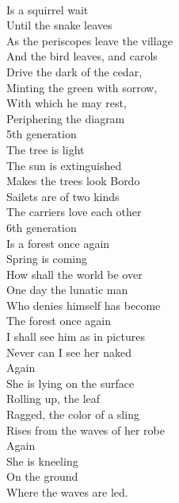 \documentclass[smalldemyvopaper,11pt,twoside,onecolumn,openright,extrafontsizes]{memoir}
\begin{document}
\\Is a squirrel wait
\\Until the snake leaves
\\As the periscopes leave the village
\\And the bird leaves, and carols
\\Drive the dark of the cedar,
\\Minting the green with sorrow,
\\With which he may rest,
\\Periphering the diagram
\\5th generation
\\The tree is light
\\The sun is extinguished
\\Makes the trees look Bordo
\\Sailets are of two kinds
\\The carriers love each other
\\6th generation
\\Is a forest once again
\\Spring is coming
\\How shall the world be over
\\One day the lunatic man
\\Who denies himself has become
\\The forest once again
\\I shall see him as in pictures
\\Never can I see her naked
\\Again
\\She is lying on the surface
\\Rolling up, the leaf
\\Ragged, the color of a sling
\\Rises from the waves of her robe
\\Again
\\She is kneeling
\\On the ground
\\Where the waves are led.
\end{document}
